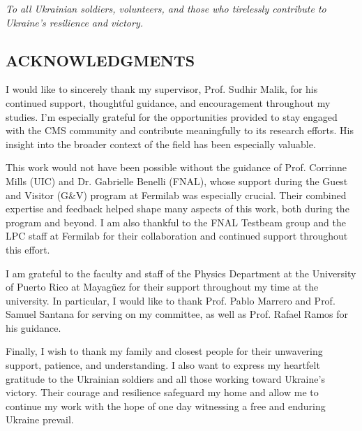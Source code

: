 


\vspace*{2in}
\begin{center}
	\emph{To all Ukrainian soldiers, volunteers, and those who tirelessly contribute to Ukraine’s resilience and victory.}
\end{center}

\newpage


\vspace*{0.5in}
\begin{center}
	\section*{ACKNOWLEDGMENTS}
\end{center}


\noindent

I would like to sincerely thank my supervisor, Prof. Sudhir Malik, for his continued support, thoughtful guidance, and encouragement throughout my studies. I’m especially grateful for the opportunities provided to stay engaged with the CMS community and contribute meaningfully to its research efforts. His insight into the broader context of the field has been especially valuable.

This work would not have been possible without the guidance of Prof. Corrinne Mills (UIC) and Dr. Gabrielle Benelli (FNAL), whose support during the Guest and Visitor (G\&V) program at Fermilab was especially crucial. Their combined expertise and feedback helped shape many aspects of this work, both during the program and beyond. I am also thankful to the FNAL Testbeam group and the LPC staff at Fermilab for their collaboration and continued support throughout this effort.

I am grateful to the faculty and staff of the Physics Department at the University of Puerto Rico at Mayagüez for their support throughout my time at the university. In particular, I would like to thank Prof. Pablo Marrero and Prof. Samuel Santana for serving on my committee, as well as Prof. Rafael Ramos for his guidance.

Finally, I wish to thank my family and closest people for their unwavering support, patience, and understanding. I also want to express my heartfelt gratitude to the Ukrainian soldiers and all those working toward Ukraine’s victory. Their courage and resilience safeguard my home and allow me to continue my work with the hope of one day witnessing a free and enduring Ukraine prevail.
